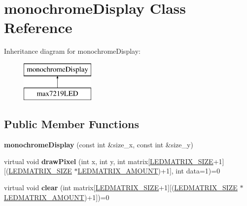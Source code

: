 \hypertarget{classmonochrome_display}{}\section{monochrome\+Display Class Reference}
\label{classmonochrome_display}
Inheritance diagram for monochrome\+Display\+:\begin{figure}[H]
\begin{center}
\leavevmode
\includegraphics[height=2.000000cm]{classmonochrome_display}
\end{center}
\end{figure}
\subsection*{Public Member Functions}
\begin{DoxyCompactItemize}
\item 
{\bfseries monochrome\+Display} (const int \&size\+\_\+x, const int \&size\+\_\+y)\hypertarget{classmonochrome_display_afdfb66cfcaca269751ff2db466335055}{}\label{classmonochrome_display_afdfb66cfcaca269751ff2db466335055}

\item 
virtual void {\bfseries draw\+Pixel} (int x, int y, int matrix\mbox{[}\hyperlink{max7219_l_e_dconstants_8hpp_a2a4cf20d00f170bb1778318f645ab6cb}{L\+E\+D\+M\+A\+T\+R\+I\+X\+\_\+\+S\+I\+ZE}+1\mbox{]}\mbox{[}(\hyperlink{max7219_l_e_dconstants_8hpp_a2a4cf20d00f170bb1778318f645ab6cb}{L\+E\+D\+M\+A\+T\+R\+I\+X\+\_\+\+S\+I\+ZE} $\ast$\hyperlink{max7219_l_e_dconstants_8hpp_aa3f1c3f51823e34beb0682e7f799793b}{L\+E\+D\+M\+A\+T\+R\+I\+X\+\_\+\+A\+M\+O\+U\+NT})+1\mbox{]}, int data=1)=0\hypertarget{classmonochrome_display_ae0d92a60755a2924799e04382f41f1f0}{}\label{classmonochrome_display_ae0d92a60755a2924799e04382f41f1f0}

\item 
virtual void {\bfseries clear} (int matrix\mbox{[}\hyperlink{max7219_l_e_dconstants_8hpp_a2a4cf20d00f170bb1778318f645ab6cb}{L\+E\+D\+M\+A\+T\+R\+I\+X\+\_\+\+S\+I\+ZE}+1\mbox{]}\mbox{[}(\hyperlink{max7219_l_e_dconstants_8hpp_a2a4cf20d00f170bb1778318f645ab6cb}{L\+E\+D\+M\+A\+T\+R\+I\+X\+\_\+\+S\+I\+ZE} $\ast$\hyperlink{max7219_l_e_dconstants_8hpp_aa3f1c3f51823e34beb0682e7f799793b}{L\+E\+D\+M\+A\+T\+R\+I\+X\+\_\+\+A\+M\+O\+U\+NT})+1\mbox{]})=0\hypertarget{classmonochrome_display_a4cc51ac0de3ff1dc880df4308b9ab056}{}\label{classmonochrome_display_a4cc51ac0de3ff1dc880df4308b9ab056}

\end{DoxyCompactItemize}
